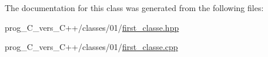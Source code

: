 The documentation for this class was generated from the following files\+:\begin{DoxyCompactItemize}
\item 
prog\+\_\+\+C\+\_\+vers\+\_\+\+C++/classes/01/\hyperlink{01_2first__classe_8hpp}{first\+\_\+classe.\+hpp}\item 
prog\+\_\+\+C\+\_\+vers\+\_\+\+C++/classes/01/\hyperlink{01_2first__classe_8cpp}{first\+\_\+classe.\+cpp}\end{DoxyCompactItemize}
